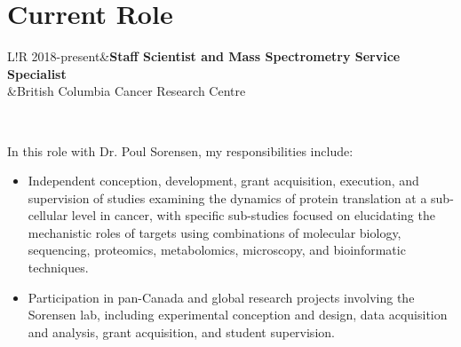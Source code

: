 \documentclass[11pt]{article}
\newcommand\VRule{\color{lightgray}\vrule width 0.5pt}
\begin{document}
\begin{addmargin}[3em]{2em}
\begin{itemize}
	\end{itemize}
\end{addmargin}

\section*{Current Role}
\begin{tabular}{L!{\VRule}R}
	2018-present&\textbf{Staff Scientist and Mass Spectrometry Service Specialist}\\
	&British Columbia Cancer Research Centre\\
\end{tabular}\\

\begin{addmargin}[7.5em]{2em}%
	In this role with Dr. Poul Sorensen, my responsibilities include:
	\begin{itemize}
		\item Independent conception, development, grant acquisition, execution, and supervision of studies examining the dynamics of protein translation at a sub-cellular level in cancer, with specific sub-studies focused on elucidating the mechanistic roles of targets using combinations of molecular biology, sequencing, proteomics, metabolomics, microscopy, and bioinformatic techniques.
		\item Participation in pan-Canada and global research projects involving the Sorensen lab, including experimental conception and design, data acquisition and analysis, grant acquisition, and student supervision.
	\end{itemize}
\end{addmargin}
\end{document}
